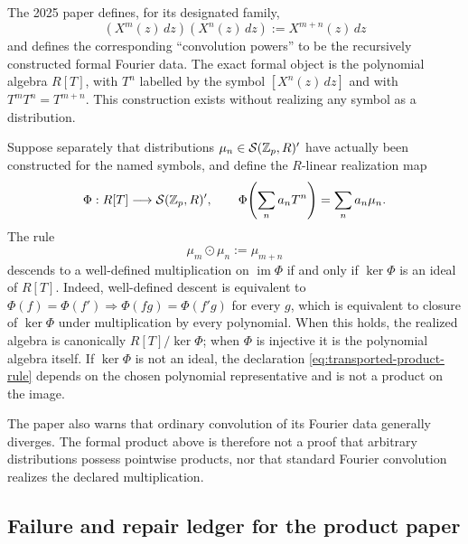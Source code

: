 \begin{sourceissue}
The 2025 paper defines, for its designated family,
\[
 (X^m(z)\,dz)(X^n(z)\,dz):=X^{m+n}(z)\,dz
\]
and defines the corresponding ``convolution powers'' to be the recursively
constructed formal Fourier data.  The exact formal object is the polynomial
algebra $R[T]$, with $T^n$ labelled by the symbol $[X^n(z)\,dz]$ and with
$T^mT^n=T^{m+n}$.  This construction exists without realizing any symbol as
a distribution.

Suppose separately that distributions
$\mu_n\in\mathcal S(\mathbb Z_p,R)'$ have actually been constructed for the named
symbols, and define the $R$-linear realization map
\[
 \Phi:R[T]\longrightarrow\mathcal S(\mathbb Z_p,R)',
 \qquad \Phi\!\left(\sum_na_nT^n\right)=\sum_na_n\mu_n.
\]
The rule
\begin{equation}
\label{eq:transported-product-rule}
 \mu_m\mathbin\odot\mu_n:=\mu_{m+n}
\end{equation}
descends to a well-defined multiplication on $\operatorname{im}\Phi$ if and
only if $\ker\Phi$ is an ideal of $R[T]$.  Indeed, well-defined descent is
equivalent to
$\Phi(f)=\Phi(f')\Rightarrow\Phi(fg)=\Phi(f'g)$ for every $g$, which is
equivalent to closure of $\ker\Phi$ under multiplication by every
polynomial.  When this holds, the realized algebra is canonically
$R[T]/\ker\Phi$; when $\Phi$ is injective it is the polynomial algebra
itself.  If $\ker\Phi$ is not an ideal, the declaration
\cref{eq:transported-product-rule} depends on the chosen polynomial
representative and is not a product on the image.

The paper also warns that ordinary convolution of its Fourier data generally
diverges.  The formal product above is therefore not a proof that arbitrary
distributions possess pointwise products, nor that standard Fourier
convolution realizes the declared multiplication.
\end{sourceissue}

\subsection{Failure and repair ledger for the product paper}

